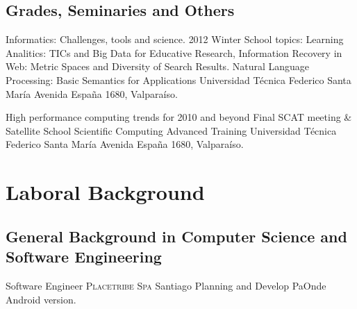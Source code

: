 \documentclass[11pt,letterpaper,roman]{moderncv}
\begin{document}
\subsection{Grades, Seminaries and Others}

	{Informatics: Challenges, tools and science.}
	{2012 Winter School}
	{topics: Learning Analitics: TICs and Big Data for Educative Research, Information Recovery in Web: Metric Spaces and Diversity of Search Results. Natural Language Processing: Basic Semantics for Applications }
	{Universidad T\'ecnica Federico Santa Mar\'ia}
	{Avenida España 1680, Valpara\'iso.}
	
	
	{High performance computing trends for 2010 and beyond}
	{Final SCAT meeting \& Satellite School}
	{Scientific Computing Advanced Training}
	{Universidad T\'ecnica Federico Santa Mar\'ia}
	{Avenida España 1680, Valpara\'iso.}


\section{Laboral Background}

\newcommand{\ingennia}{\textsc{Ingennia SpA}\xspace}
\newcommand{\multicaja}{\textsc{Multicaja SA}\xspace}
\newcommand{\ikom}{\textsc{Ikom SA}\xspace}
\newcommand{\jobbitgames}{\textsc{JobbitGames SA}\xspace}
\newcommand{\paonde}{\textsc{PaOnde SA}\xspace}
\newcommand{\mataveri}{\textsc{Mataveri LTDA}\xspace}
\newcommand{\placetribe}{\textsc{Placetribe Spa}\xspace}
\newcommand{\ipgamma}{\textsc{Instituto Profesional de Electronica Gamma}\xspace}
\newcommand{\otecnewline}{\textsc{New Line Capacitación}\xspace}

\newcommand{\stgo}{Santiago\xspace}
\newcommand{\intership}{Laboral \& Professional Intership}

\newcommand{\se}{Software Engineer\xspace}
\newcommand{\sa}{Software Advisor\xspace}
\newcommand{\sarch}{Software Architect\xspace}
\newcommand{\cf}{Co Founder}

\subsection{General Background in Computer Science and Software Engineering}

	 {\se} {\placetribe} {\stgo} {}
	{Planning and Develop PaOnde Android version.}
\end{document}
